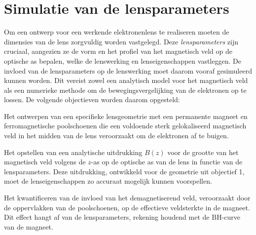 \documentclass[we,twoside,openright,a4paper,11pt]{uantwerpenbamathesis}
\begin{document}
\chapter{Simulatie van de lensparameters}\label{ch:methodologie}
Om een ontwerp voor een werkende elektronenlens te realiseren moeten de dimensies van de lens zorgvuldig worden vastgelegd. Deze \textit{lensparameters} zijn cruciaal, aangezien ze de vorm en het profiel van het magnetisch veld op de optische as bepalen, welke de lenswerking en lenseigenschappen vastleggen. De invloed van de lensparameters op de lenswerking moet daarom vooraf gesimuleerd kunnen worden. Dit vereist zowel een analytisch model voor het magnetisch veld als een numerieke methode om de bewegingsvergelijking van de elektronen op te lossen. De volgende objectieven worden daarom opgesteld:
\begin{tcolorbox}[colback=red!10!white, colframe=red!40!white, sharp corners, title=Objectief 1]
    Het ontwerpen van een specifieke lensgeometrie met een permanente magneet en ferromagnetische poolschoenen die een voldoende sterk gelokaliseerd magnetisch veld in het midden van de lens veroorzaakt om de elektronen af te buigen.
\end{tcolorbox}

\begin{tcolorbox}[colback=red!10!white, colframe=red!40!white, sharp corners, title=Objectief 2]
    Het opstellen van een analytische uitdrukking $B(z)$ voor de grootte van het magnetisch veld volgens de $z$-as op de optische as van de lens in functie van de lensparameters. Deze uitdrukking, ontwikkeld voor de geometrie uit objectief 1, moet de lenseigenschappen zo accuraat mogelijk kunnen voorspellen.
\end{tcolorbox}

\begin{tcolorbox}[colback=red!10!white, colframe=red!40!white, sharp corners, title=Objectief 3]
    Het kwantificeren van de invloed van het demagnetiserend veld, veroorzaakt door de oppervlakken van de poolschoenen, op de effectieve veldsterkte in de magneet. Dit effect hangt af van de lensparameters, rekening houdend met de $\mathrm{BH}$-curve van de magneet.
\end{tcolorbox}
\end{document}

